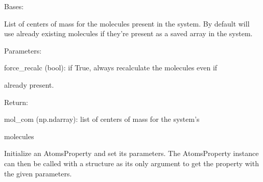 \documentclass[letterpaper,10pt,english]{sphinxmanual}
\begin{document}
\begin{fulllineitems}
\label{doctree/soprano.properties.linkage.linkage:soprano.properties.linkage.linkage.MoleculeCOM}
Bases: {\hyperref[doctree/soprano.properties.atomsproperty:soprano.properties.atomsproperty.AtomsProperty]{\emph{}}}

List of centers of mass for the molecules present in the system. By
default will use already existing molecules if they're present as a saved
array in the system.

\begin{DUlineblock}{0em}
\item[] Parameters:    
\item[]
\begin{DUlineblock}{\DUlineblockindent}
\item[] force\_recalc (bool): if True, always recalculate the molecules even if
\item[]
\begin{DUlineblock}{\DUlineblockindent}
\item[] already present.
\end{DUlineblock}
\end{DUlineblock}
\end{DUlineblock}

\begin{DUlineblock}{0em}
\item[] Return:
\item[]
\begin{DUlineblock}{\DUlineblockindent}
\item[] mol\_com (np.ndarray): list of centers of mass for the system's
\item[]
\begin{DUlineblock}{\DUlineblockindent}
\item[] molecules
\end{DUlineblock}
\end{DUlineblock}
\end{DUlineblock}

Initialize an AtomsProperty and set its parameters.
The AtomsProperty instance can then be called with a structure as its
only argument to get the property with the given parameters.


\end{fulllineitems}
\end{document}
